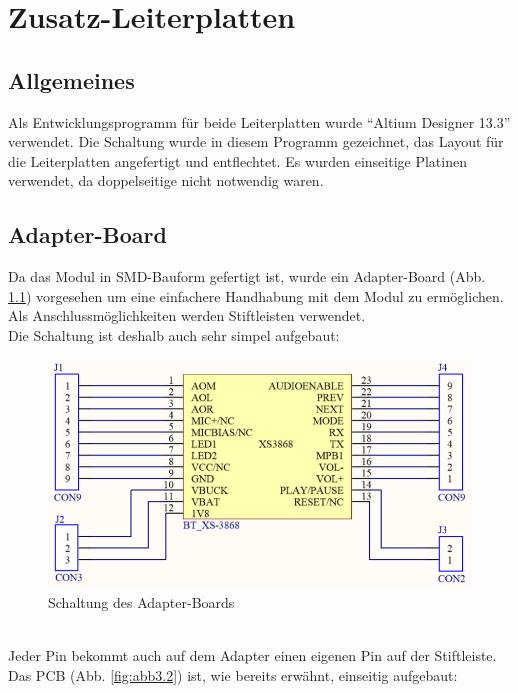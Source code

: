\chapter{Zusatz-Leiterplatten}
\section{Allgemeines}
Als Entwicklungsprogramm für beide Leiterplatten wurde  \enquote{Altium Designer 13.3} verwendet. Die Schaltung wurde in diesem Programm gezeichnet, das Layout für die Leiterplatten angefertigt und entflechtet. Es wurden einseitige Platinen verwendet, da doppelseitige nicht notwendig waren.


\section{Adapter-Board}
Da das Modul in SMD-Bauform gefertigt ist, wurde ein Adapter-Board (Abb. \ref{fig:abb3.1}) vorgesehen um eine einfachere Handhabung mit dem Modul zu ermöglichen. Als Anschlussmöglichkeiten werden Stiftleisten verwendet.\\
Die Schaltung ist deshalb auch sehr simpel aufgebaut:
\begin{figure} [h]
	\centering
	\caption{Schaltung des Adapter-Boards}
	\label {fig:abb3.1}
	\includegraphics[width=1\textwidth]{schaltungen/adapter_sch.png}
\end{figure} \\
Jeder Pin bekommt auch auf dem Adapter einen eigenen Pin auf der Stiftleiste.
\newpage
Das PCB (Abb. \ref{fig:abb3.2}) ist, wie bereits erwähnt, einseitig aufgebaut:
